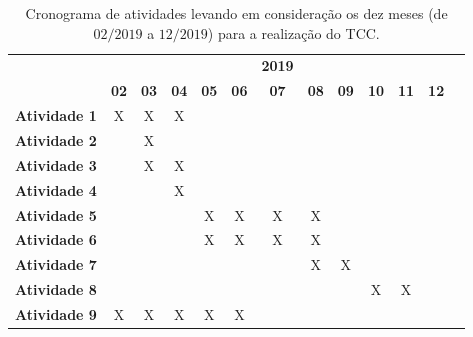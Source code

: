 \begin{table}
\caption{Cronograma de atividades levando em consideração os dez meses (de $02/2019$ a $12/2019$) para a realização do TCC.}
\label{tab:cronograma}

\begin{center}
\begin{small}
\begin{tabular}{p{5cm}cccccccccccc}
  \toprule
  & &  &  & &  & \textbf{2019}  & &  &  &  &  & \\
                                        & \textbf{02} & \textbf{03} & \textbf{04} & \textbf{05} & \textbf{06} & \textbf{07} & \textbf{08} & \textbf{09} & \textbf{10} & \textbf{11} & \textbf{12} \\
  \midrule

  \textbf{Atividade 1}                     &      X      &      X      &      X      &           &             &             &             &             &             &             &             \\
  \textbf{Atividade 2} &             &      X      &            &             &             &             &             &             &             &             &             \\
  \textbf{Atividade 3}         &             &     X        &    X         &            &            &            &            &            &             &             &             \\
  \textbf{Atividade 4}         &             &             &    X         &            &            &            &            &            &             &             &             \\
  \textbf{Atividade 5}         &             &             &             &      X      &       X     &   X         &     X       &            &             &             &             \\
  \textbf{Atividade 6}         &             &             &             &      X      &     X       &     X       &    X        &            &             &             &             \\
  \textbf{Atividade 7}         &             &             &             &            &            &            &      X      &      X      &             &             &             \\
  \textbf{Atividade 8}         &             &             &             &            &            &            &           &            &   X          &      X       &             \\
  \textbf{Atividade 9}          &      X      &      X      &      X      &      X      &      X      &             &             &             &             &             &             \\


\end{tabular}
\end{small}
\end{center}
\end{table}
